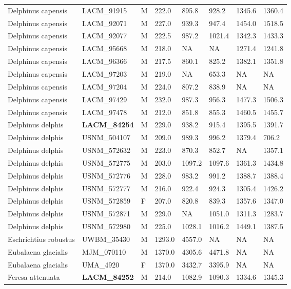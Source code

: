 \begin{longtable}{|p{1.95in}p{1.1in}p{.15in}p{.4in}p{.4in}p{.4in}p{.4in}p{.4in}|}
  Delphinus capensis & LACM\_91915 & M & 222.0 & 895.8 & 928.2 & 1345.6 & 1360.4 \\ 
  Delphinus capensis & LACM\_92071 & M & 227.0 & 939.3 & 947.4 & 1454.0 & 1518.5 \\ 
  Delphinus capensis & LACM\_92077 & M & 222.5 & 987.2 & 1021.4 & 1342.3 & 1433.3 \\ 
  Delphinus capensis & LACM\_95668 & M & 218.0 & NA & NA & 1271.4 & 1241.8 \\ 
  Delphinus capensis & LACM\_96366 & M & 217.5 & 860.1 & 825.2 & 1382.1 & 1351.8 \\ 
  Delphinus capensis & LACM\_97203 & M & 219.0 & NA & 653.3 & NA & NA  \\ 
  Delphinus capensis & LACM\_97204 & M & 224.0 & 807.2 & 838.9 & NA & NA  \\ 
  Delphinus capensis & LACM\_97429 & M & 232.0 & 987.3 & 956.3 & 1477.3 & 1506.3 \\ 
  Delphinus capensis & LACM\_97478 & M & 212.0 & 851.8 & 855.3 & 1460.5 & 1455.7 \\ 
  Delphinus delphis & \textbf{ LACM\_84254 } & M & 229.0 & 938.2 & 915.4 & 1395.5 & 1391.7 \\ 
  Delphinus delphis & USNM\_504107 & M & 209.0 & 989.3 & 996.2 & 1379.4 & 706.2 \\ 
  Delphinus delphis & USNM\_572632 & M & 223.0 & 870.3 & 852.7 & NA & 1357.1 \\ 
  Delphinus delphis & USNM\_572775 & M & 203.0 & 1097.2 & 1097.6 & 1361.3 & 1434.8 \\ 
  Delphinus delphis & USNM\_572776 & M & 228.0 & 983.2 & 991.2 & 1388.7 & 1388.4 \\ 
  Delphinus delphis & USNM\_572777 & M & 216.0 & 922.4 & 924.3 & 1305.4 & 1426.2 \\ 
  Delphinus delphis & USNM\_572859 & F & 207.0 & 820.8 & 839.3 & 1357.6 & 1347.0 \\ 
  Delphinus delphis & USNM\_572871 & M & 229.0 & NA & 1051.0 & 1311.3 & 1283.7 \\ 
  Delphinus delphis & USNM\_572980 & M & 225.0 & 1028.1 & 1016.2 & 1449.1 & 1387.5 \\ 
  Eschrichtius robustus & UWBM\_35430 & M & 1293.0 & 4557.0 & NA & NA & NA  \\ 
  Eubalaena glacialis & MJM\_070110 & M & 1370.0 & 4305.6 & 4471.8 & NA & NA  \\ 
  Eubalaena glacialis & UMA\_4920 & F & 1370.0 & 3432.7 & 3395.9 & NA & NA  \\ 
  Feresa attenuata & \textbf{ LACM\_84252 } & M & 214.0 & 1082.9 & 1090.3 & 1334.6 & 1345.3 \\ 

\end{longtable}

